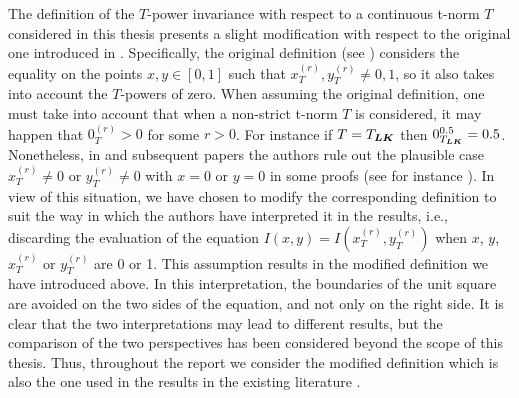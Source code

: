 \begin{remark}\label{remark:PITmodification}
	The definition of the $T$-power invariance with respect to a continuous t-norm $T$ considered in this thesis presents a slight modification with respect to the original one introduced in \cite{Massanet2017}. Specifically, the original definition (see \cite[Definition~5]{Massanet2017}) considers the equality \PIT on the points $x,y \in [0,1]$ such that $x_T^{(r)}, y_T^{(r)} \not = 0,1$, so it also takes into account the $T$-powers of zero. When assuming the original definition, one must take into account that when a non-strict t-norm $T$ is considered, it may happen that $0_T^{(r)}>0$ for some $r>0$. For instance if $T=T_{\bm{LK}}$ then $0_{T_{\bm{LK}}}^{0.5}=0.5$. Nonetheless, in \cite{Massanet2017} and subsequent papers \cite{Massanet2019,Massanet2019B} the authors rule out the plausible case $x_T^{(r)} \not = 0$ or $y_T^{(r)} \not = 0$ with $x=0$ or $y=0$ in some proofs (see for instance \cite[Propositions 11 and 12]{Massanet2019B}). In view of this situation, we have chosen to modify the corresponding definition to suit the way in which the authors have interpreted it in the results, i.e., discarding the evaluation of the equation $I(x,y)=I\left(x_T^{(r)}, y_T^{(r)}\right)$ when $x$, $y$, $x_T^{(r)}$ or $y_T^{(r)}$ are 0 or 1. This assumption results in the modified definition we have introduced above.  In this interpretation, the boundaries of the unit square are avoided on the two sides of the equation, and not only on the right side. It is clear that the two interpretations may lead to different results, but the comparison of the two perspectives has been considered beyond the scope of this thesis. Thus, throughout the report we consider the modified definition which is also the one used in the results in the existing literature \cite{Massanet2017,Massanet2019,Massanet2019B}.
\end{remark}

